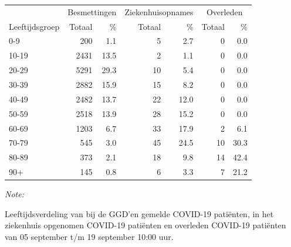 \documentclass[
  english,
  man,floatsintext]{apa6}
\begin{document}
\begin{table}[H]
\centering\begingroup\fontsize{11}{13}\selectfont

\begin{threeparttable}
\begin{tabular}{lrrrrrr}
\toprule
\multicolumn{1}{c}{ } & \multicolumn{2}{c}{Besmettingen} & \multicolumn{2}{c}{Ziekenhuisopnames} & \multicolumn{2}{c}{Overleden} \\
\cmidrule(l{3pt}r{3pt}){2-3} \cmidrule(l{3pt}r{3pt}){4-5} \cmidrule(l{3pt}r{3pt}){6-7}
Leeftijdsgroep & Totaal & \% & Totaal & \% & Totaal & \%\\
\midrule
0-9 & 200 & 1.1 & 5 & 2.7 & 0 & 0.0\\
10-19 & 2431 & 13.5 & 2 & 1.1 & 0 & 0.0\\
20-29 & 5291 & 29.3 & 10 & 5.4 & 0 & 0.0\\
30-39 & 2882 & 15.9 & 15 & 8.2 & 0 & 0.0\\
40-49 & 2482 & 13.7 & 22 & 12.0 & 0 & 0.0\\
50-59 & 2518 & 13.9 & 28 & 15.2 & 0 & 0.0\\
60-69 & 1203 & 6.7 & 33 & 17.9 & 2 & 6.1\\
70-79 & 545 & 3.0 & 45 & 24.5 & 10 & 30.3\\
80-89 & 373 & 2.1 & 18 & 9.8 & 14 & 42.4\\
90+ & 145 & 0.8 & 6 & 3.3 & 7 & 21.2\\
\bottomrule
\end{tabular}
\begin{tablenotes}
\item \textit{Note: } 
\item Leeftijdsverdeling van bij de GGD’en gemelde COVID-19 patiënten, in het ziekenhuis opgenomen COVID-19 patiënten en overleden COVID-19 patiënten van 05 september t/m 19 september 10:00 uur.
\end{tablenotes}
\end{threeparttable}
\endgroup{}
\end{table}
\end{document}
